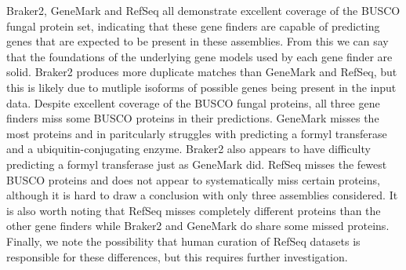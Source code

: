 
Braker2, GeneMark and RefSeq all demonstrate excellent coverage of the
BUSCO fungal protein set, indicating that these gene finders are
capable of predicting genes that are expected to be present in these
assemblies. From this we can say that the foundations of the
underlying gene models used by each gene finder are solid. Braker2
produces more duplicate matches than GeneMark and RefSeq, but this is
likely due to mutliple isoforms of possible genes being present in the
input data. Despite excellent coverage of the BUSCO fungal proteins,
all three gene finders miss some BUSCO proteins in their
predictions. GeneMark misses the most proteins and in paritcularly
struggles with predicting a formyl transferase and a
ubiquitin-conjugating enzyme. Braker2 also appears to have difficulty
predicting a formyl transferase just as GeneMark did. RefSeq misses
the fewest BUSCO proteins and does not appear to systematically miss
certain proteins, although it is hard to draw a conclusion with only
three assemblies considered. It is also worth noting that RefSeq
misses completely different proteins than the other gene finders while
Braker2 and GeneMark do share some missed proteins. Finally, we note
the possibility that human curation of RefSeq datasets is responsible
for these differences, but this requires further investigation.
